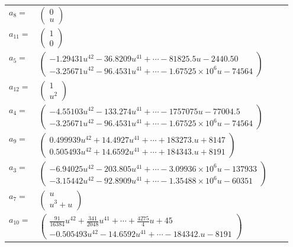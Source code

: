 \documentclass[1p]{elsarticle_modified}
\theoremstyle{definition}
\begin{document}
\begin{tabular}{m{7pt} m{180pt} m{7pt} m{180pt} }
\flushright $a_{8}=$&$\begin{pmatrix}0\\u\end{pmatrix}$ \\
\flushright $a_{11}=$&$\begin{pmatrix}1\\0\end{pmatrix}$ \\
\flushright $a_{5}=$&$\begin{pmatrix}-1.29431 u^{42}-36.8209 u^{41}+\cdots-81825.5 u-2440.50\\-3.25671 u^{42}-96.4531 u^{41}+\cdots-1.67525\times10^{6} u-74564\end{pmatrix}$ \\
\flushright $a_{12}=$&$\begin{pmatrix}1\\u^2\end{pmatrix}$ \\
\flushright $a_{4}=$&$\begin{pmatrix}-4.55103 u^{42}-133.274 u^{41}+\cdots-1757075 u-77004.5\\-3.25671 u^{42}-96.4531 u^{41}+\cdots-1.67525\times10^{6} u-74564\end{pmatrix}$ \\
\flushright $a_{9}=$&$\begin{pmatrix}0.499939 u^{42}+14.4927 u^{41}+\cdots+183273. u+8147\\0.505493 u^{42}+14.6592 u^{41}+\cdots+184343. u+8191\end{pmatrix}$ \\
\flushright $a_{3}=$&$\begin{pmatrix}-6.94025 u^{42}-203.805 u^{41}+\cdots-3.09936\times10^{6} u-137933\\-3.15442 u^{42}-92.8909 u^{41}+\cdots-1.35488\times10^{6} u-60351\end{pmatrix}$ \\
\flushright $a_{7}=$&$\begin{pmatrix}u\\u^3+u\end{pmatrix}$ \\
\flushright $a_{10}=$&$\begin{pmatrix}\frac{91}{16384} u^{42}+\frac{341}{2048} u^{41}+\cdots+\frac{4275}{4} u+45\\-0.505493 u^{42}-14.6592 u^{41}+\cdots-184342. u-8191\end{pmatrix}$ \\

\end{tabular}
\end{document}
